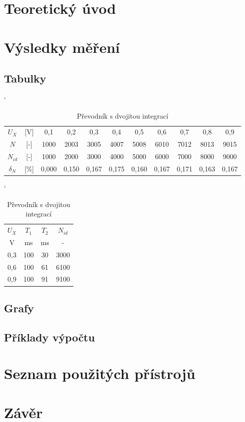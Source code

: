 \documentclass[a4paper, czech]{article}
\begin{document}
\section{Teoretický úvod}

\section{Výsledky měření}

\subsection{Tabulky}

\begin{table}[H]
    \catcode`
    \centering
    \caption{Převodník s dvojitou integrací}
    \begin{tabular}{cc|ccccccccc}
        \toprule
        $U_X$  & [V]  & 0,1   & 0,2   & 0,3   & 0,4   & 0,5   & 0,6   & 0,7   & 0,8   & 0,9   \\
        \cmidrule(rl){1-11}
        $N$   & [-]  & 1000  & 2003  & 3005  & 4007  & 5008  & 6010  & 7012  & 8013  & 9015  \\
        $N_{id}$ & [-]  & 1000  & 2000  & 3000  & 4000  & 5000  & 6000  & 7000  & 8000  & 9000  \\
        $\delta_N$  & [\%] & 0,000 & 0,150 & 0,167 & 0,175 & 0,160 & 0,167 & 0,171 & 0,163 & 0,167 \\
        \bottomrule
    \end{tabular}
\end{table}

\begin{table}[H]
    \catcode`
    \centering
    \caption{Převodník s dvojitou integrací}
    \begin{tabular}{cccc}
        \toprule
        $U_X$  & $T_1$  & $T_2$ & $N_{id}$  \\
        \cmidrule(rl){1-1}
        \cmidrule(rl){2-2}
        \cmidrule(rl){3-3}
        \cmidrule(rl){4-4}
        V   & ms  & ms & -    \\
        \midrule
        0,3 & 100 & 30 & 3000 \\
        0,6 & 100 & 61 & 6100 \\
        0,9 & 100 & 91 & 9100 \\
        \bottomrule
    \end{tabular}
\end{table}

\subsection{Grafy}

\subsection{Příklady výpočtu}

\section{Seznam použitých přístrojů}

\section{Závěr}
\end{document}
